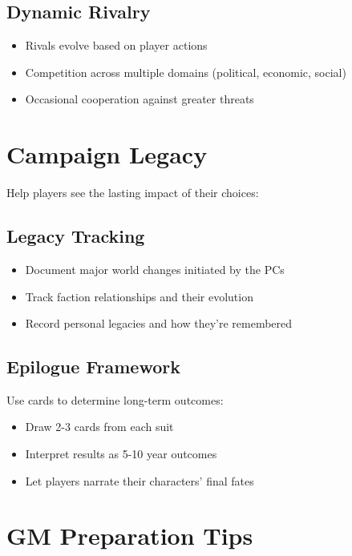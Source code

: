 \subsection*{Dynamic Rivalry}

\begin{itemize}
    \item Rivals evolve based on player actions
    \item Competition across multiple domains (political, economic, social)
    \item Occasional cooperation against greater threats
\end{itemize}

\section{Campaign Legacy}

Help players see the lasting impact of their choices:

\subsection*{Legacy Tracking}

\begin{itemize}
    \item Document major world changes initiated by the PCs
    \item Track faction relationships and their evolution
    \item Record personal legacies and how they're remembered
\end{itemize}

\subsection*{Epilogue Framework}

Use cards to determine long-term outcomes:
\begin{itemize}
    \item Draw 2-3 cards from each suit
    \item Interpret results as 5-10 year outcomes
    \item Let players narrate their characters' final fates
\end{itemize}

\section{GM Preparation Tips}


